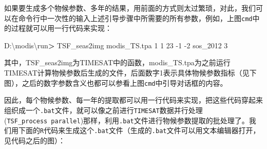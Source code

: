 \documentclass[
]{article}
\newenvironment{Shaded}{\begin{snugshade}}{\end{snugshade}}
\newcommand{\AttributeTok}[1]{\textcolor[rgb]{0.77,0.63,0.00}{#1}}
\newcommand{\ExtensionTok}[1]{#1}
\newcommand{\NormalTok}[1]{#1}
\newcommand{\OperatorTok}[1]{\textcolor[rgb]{0.81,0.36,0.00}{\textbf{#1}}}
\begin{document}
如果要生成多个物候参数、多年的结果，用前面的方式则太过繁琐，对此，我们可以在命令行中一次性的输入上述引导步骤中所需要的所有参数，例如，上图\texttt{cmd}中的过程就可以用一行代码来实现：

\begin{Shaded}
\begin{Highlighting}[]
\ExtensionTok{D:\textbackslash{}modis\textbackslash{}run}\OperatorTok{\textgreater{}}\NormalTok{ TSF\_seas2img modis\_TS.tpa 1 1 23 }\AttributeTok{{-}1} \AttributeTok{{-}2}\NormalTok{ sos\_2012 3}
\end{Highlighting}
\end{Shaded}

其中，TSF\_seas2img为TIMESAT中的函数，modis\_TS.tpa为之前运行TIMESAT计算物候参数后生成的文件，后面数字1表示具体物候参数指标（见下图），之后的数字参数含义也都可以参看上图\texttt{cmd}中引导对话框的内容。

因此，每个物候参数、每一年的提取都可以用一行代码来实现，把这些代码穿起来组织成一个\texttt{.bat}文件，就可以像之前进行\texttt{TIMESAT}数据并行处理(\texttt{TSF\_process\ parallel})那样，利用\texttt{.bat}文件进行物候参数提取的批处理了。我们用下面的\texttt{R}代码来生成这个\texttt{.bat}文件（生成的\texttt{.bat}文件可以用文本编辑器打开，见代码之后的图）：
\end{document}
